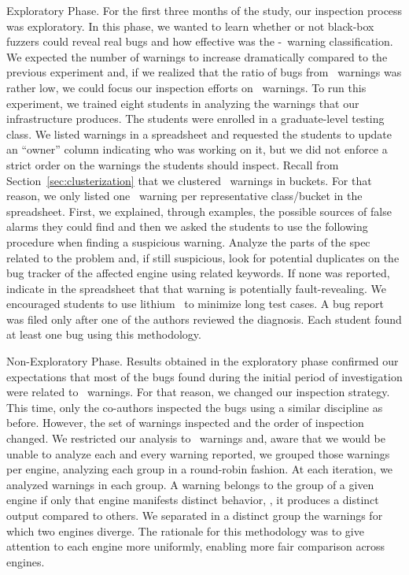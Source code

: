 \documentclass[smallextended]{svjour3}
\begin{document}

\vspace{0.5ex} \lbrack{}Exploratory Phase.\rbrack{} For the first
three months of the study, our inspection process was exploratory.  In
this phase, we wanted to learn whether or not black-box fuzzers could
reveal real bugs and how effective was the \hi{}-\lo\ warning
classification.  We expected the number of warnings to increase
dramatically compared to the previous experiment and, if we realized
that the ratio of bugs from \lo\ warnings was rather low, we could
focus our inspection efforts on \hi\ warnings. To run this experiment,
we trained eight students in analyzing the warnings that our
infrastructure produces. The students were enrolled in a
graduate-level testing class. We listed warnings in a spreadsheet and
requested the students to update an ``owner'' column indicating who
was working on it, but we did not enforce a strict order on the
warnings the students should inspect. Recall from
Section~\ref{sec:clusterization} that we clustered \lo\ warnings in
buckets. For that reason, we only listed one \lo\ warning per
representative class/bucket in the spreadsheet. First, we explained,
through examples, the possible sources of false alarms they could find
and then we asked the students to use the following procedure when
finding a suspicious warning. Analyze the parts of the spec related to
the problem and, if still suspicious, look for potential duplicates on
the bug tracker of the affected engine using related keywords. If none
was reported, indicate in the spreadsheet that that warning is
potentially fault-revealing. We encouraged students to use
lithium~\cite{lithium} to minimize long test cases. A bug report
was filed only after one of the authors reviewed the diagnosis. Each
student found at least one bug using this methodology.

\vspace{0.5ex}
\lbrack{}Non-Exploratory Phase.\rbrack{} Results obtained in the
exploratory phase confirmed our expectations that most of the bugs
found during the initial period of investigation were related to
\hi\ warnings. For that reason, we changed our inspection
strategy. This time, only the co-authors inspected the bugs using a
similar discipline as before. However, the set of warnings inspected
and the order of inspection changed. We restricted our analysis to
\hi\ warnings and, aware that we would be unable to analyze each and
every warning reported, we grouped those warnings per engine,
analyzing each group in a round-robin fashion.  At each iteration, we
analyzed \warningsIteration{} warnings in each group. A warning
belongs to the group of a given engine if only that engine manifests
distinct behavior, \ie{}, it produces a distinct output compared to
others. We separated in a distinct group the warnings for which two
engines diverge. The rationale for this methodology was to give
attention to each engine more uniformly, enabling more fair comparison
across engines.
\end{document}
